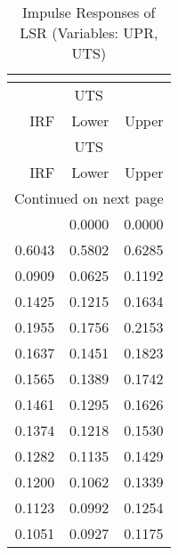 \begin{longtable}{rrr}
\caption{Impulse Responses of LSR (Variables: UPR, UTS)}\\
\label{tab:lsr_irf_group2}\\
\toprule
\multicolumn{3}{c}{UTS} \\
IRF & Lower & Upper \\
\midrule
\endfirsthead
\toprule
\multicolumn{3}{c}{UTS} \\
IRF & Lower & Upper \\
\midrule
\endhead
\midrule
\multicolumn{3}{r}{Continued on next page} \\
\midrule
\endfoot
\bottomrule
\endlastfoot
0.0000 & 0.0000 & 0.0000 \\
0.6043 & 0.5802 & 0.6285 \\
0.0909 & 0.0625 & 0.1192 \\
0.1425 & 0.1215 & 0.1634 \\
0.1955 & 0.1756 & 0.2153 \\
0.1637 & 0.1451 & 0.1823 \\
0.1565 & 0.1389 & 0.1742 \\
0.1461 & 0.1295 & 0.1626 \\
0.1374 & 0.1218 & 0.1530 \\
0.1282 & 0.1135 & 0.1429 \\
0.1200 & 0.1062 & 0.1339 \\
0.1123 & 0.0992 & 0.1254 \\
0.1051 & 0.0927 & 0.1175 \\
\end{longtable}